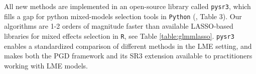 
All new methods are implemented in an open-source library called \texttt{pysr3}, which fills a gap for python mixed-models selection tools in \texttt{Python} (\cite{Buscemi2019Survey}, Table 3). Our algorithms are  1-2 orders of magnitude faster than available LASSO-based libraries for  mixed effects selection in \texttt{R},  see Table \ref{table:glmmlasso}. \texttt{pysr3} enables a standardized comparison of different methods in the LME setting, and makes both the PGD framework and its SR3 extension available to practitioners working with LME models. 



